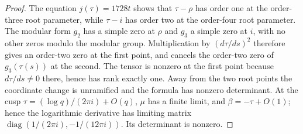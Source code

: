 \begin{proof}
The equation $j(\tau)=1728t$ shows that $\tau-\rho$ has order one
at the order-three root parameter, while $\tau-i$ has order two
at the order-four root parameter. The modular form $g_2$ has a
simple zero at $\rho$ and $g_3$ a simple zero at $i$, with no
other zeros modulo the modular group. Multiplication by
$(d\tau/ds)^2$ therefore gives an order-two zero at the first
point, and cancels the order-two zero of $g_3(\tau(s))$ at the
second. The tensor is nonzero at the first point because
$d\tau/ds\ne0$ there, hence has rank exactly one. Away from the
two root points the coordinate change is unramified and the
formula has nonzero determinant. At the cusp
$\tau=(\log q)/(2\pi i)+O(q)$, $\mu$ has a finite limit, and
$\beta=-\tau+O(1)$; hence the logarithmic derivative has limiting
matrix $\operatorname{diag}(1/(2\pi i),-1/(12\pi i))$.
Its determinant is nonzero.
\end{proof}